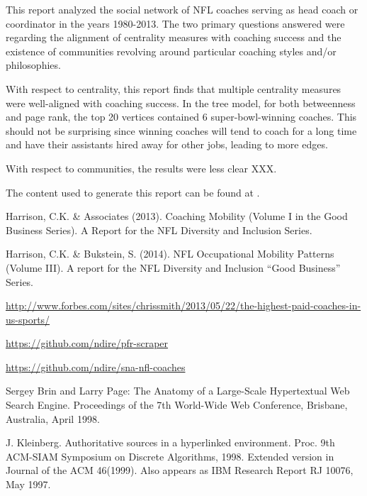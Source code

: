 \documentclass[11pt]{article}\usepackage[]{graphicx}\usepackage[]{color}
\begin{document}
This report analyzed the social network of NFL coaches serving as head coach or
coordinator in the years 1980-2013.  The two primary questions answered were
regarding the alignment of centrality measures with coaching success and the
existence of communities revolving around particular coaching styles and/or
philosophies.

With respect to centrality, this report finds that multiple centrality measures
were well-aligned with coaching success.  In the tree model, for both
betweenness and page rank, the top 20 vertices contained 6 super-bowl-winning
coaches.  This should not be surprising since winning coaches will tend to
coach for a long time and have their assistants hired away for other jobs,
leading to more edges.

With respect to communities, the results were less clear XXX.

The content used to generate this report can be found at \cite{project}.

\begin{thebibliography}{99}

 Harrison, C.K. \& Associates (2013). Coaching Mobility (Volume I in the Good Business Series). A Report for the NFL Diversity and Inclusion Series.

 Harrison, C.K. \& Bukstein, S. (2014). NFL Occupational Mobility Patterns (Volume III). A report for the NFL Diversity and Inclusion “Good Business” Series.

  \url{http://www.forbes.com/sites/chrissmith/2013/05/22/the-highest-paid-coaches-in-us-sports/}

 \url{https://github.com/ndire/pfr-scraper}

 \url{https://github.com/ndire/sna-nfl-coaches}

 Sergey Brin and Larry Page: The Anatomy of a Large-Scale Hypertextual Web Search Engine. Proceedings of the 7th World-Wide Web Conference, Brisbane, Australia, April 1998.

 J. Kleinberg. Authoritative sources in a hyperlinked environment. Proc. 9th ACM-SIAM Symposium on Discrete Algorithms, 1998. Extended version in Journal of the ACM 46(1999). Also appears as IBM Research Report RJ 10076, May 1997.

\end{thebibliography}
\end{document}
